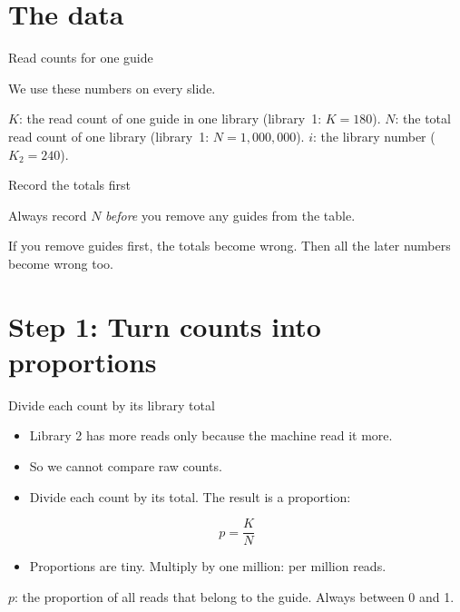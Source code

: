 \documentclass[aspectratio=169,11pt]{beamer}
\begin{document}
\section{The data}

\begin{frame}{Read counts for one guide}
\centering
\datatable

\smallskip
\small We use these numbers on every slide.
\medskip

\begin{symbols}
\small
$K$: the read count of one guide in one library (library~1: $K = 180$).\quad
$N$: the total read count of one library (library~1: $N = 1{,}000{,}000$).\quad
$i$: the library number ($K_2 = 240$).
\end{symbols}
\end{frame}

\begin{frame}{Record the totals first}
\begin{remember}
Always record $N$ \emph{before} you remove any guides from the table.

If you remove guides first, the totals become wrong. Then all the later
numbers become wrong too.
\end{remember}
\end{frame}

\section{Step 1: Turn counts into proportions}

\begin{frame}{Divide each count by its library total}
\begin{itemize}
\item Library 2 has more reads only because the machine read it more.
\item So we cannot compare raw counts.
\item Divide each count by its total. The result is a \alert{proportion}:
\end{itemize}
\[
p = \frac{K}{N}
\]
\begin{itemize}
\item Proportions are tiny. Multiply by one million: \alert{per million}
  reads.
\end{itemize}
\begin{symbols}
\small $p$: the proportion of all reads that belong to the guide. Always
between 0 and 1.
\end{symbols}
\end{frame}
\end{document}
